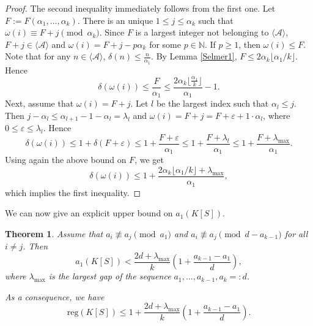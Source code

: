 \documentclass[11pt]{article}
\newtheorem{Theorem}{Theorem}[section]
\def\reg{\mathrm{reg}}
\def\Acal{{\mathcal A}}
\def\Nset{{\mathbb N}}
\theoremstyle{remark}
\theoremstyle{definition}
\begin{document}
\begin{proof}  The second inequality immediately follows from the first one. Let $F:= F(\alpha_1,\ldots,\alpha_k)$. There is an unique $1\le j \le \alpha_k$ such that $\omega(i) \equiv F+j \pmod{\alpha_k}$. Since $F$ is a largest integer not belonging to $\langle \Acal \rangle$, $F+j \in \langle \Acal \rangle$ and
$\omega(i) = F+j - p\alpha_k$ for some $p\in \Nset$. If $p\ge 1$, then $\omega(i) \leq F$. Note that for any $n\in \langle \Acal \rangle$, $\delta(n) \leq \frac{n}{\alpha_1}$. By Lemma \ref{Selmer1}, $F\le 2\alpha_k \lfloor \alpha_1/ k \rfloor$. Hence 
$$\delta(\omega(i)) \leq \frac{F}{\alpha_1} \leq \frac{2\alpha_k \lfloor \frac{\alpha_1}{k}\rfloor}{\alpha_1} -1.$$
Next, assume that $\omega(i) = F+j$. Let $l$ be the largest index such that $\alpha_l \le j$. Then $j-\alpha_l \leq \alpha_{l+1} - 1 - \alpha_l = \lambda_l$ and
$\omega(i) = F+ j = F+ \varepsilon + 1\cdot \alpha_l$, where $0\leq \varepsilon \leq \lambda_l$. Hence
$$ \delta(\omega(i)) \leq 1 + \delta(F+ \varepsilon) \leq  1+ \frac{F+ \varepsilon}{\alpha_1} \leq  1+ \frac{F+ \lambda_l}{\alpha_1} \leq 1+ \frac{F+ \lambda_{\max}}{\alpha_1}.$$
Using again the above bound on $F$, we get
$$ \delta(\omega(i)) \leq 1 +  \frac{2\alpha_k \lfloor \alpha_1/k \rfloor + \lambda_{\max}}{\alpha_1} ,$$
which implies the first inequality.
\end{proof}

We can now give an explicit upper bound on $a_1(K[S])$.

\begin{Theorem} \label{A9} Assume that $a_i
 \not\equiv a_j \pmod{a_1}$ and  $a_i
 \not\equiv a_j \pmod{d -a_{k-1}}$ for all $i\neq j$. Then
 $$a_1(K[S]) <  \frac{2d+\lambda_{\max}}{k}\left( 1+\frac{a_{k-1}-a_1}{d} \right),$$
 where $\lambda_{\max}$ is the largest gap of the sequence $a_1,\ldots,a_{k-1}, a_k=:d$.
 
 As a consequence, we have
 $$\reg(K[S]) \leq 1+  \frac{2d+\lambda_{\max}}{k}\left( 1+\frac{a_{k-1}-a_1}{d} \right).$$
\end{Theorem}
\end{document}
